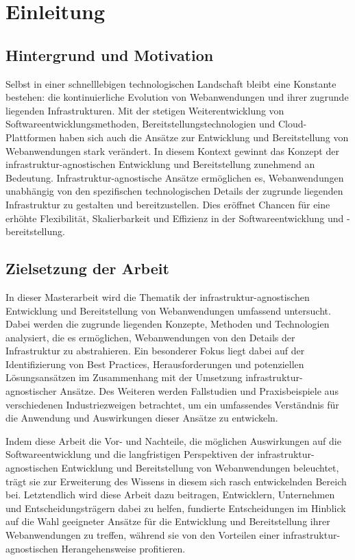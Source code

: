 \chapter{Einleitung}

\section{Hintergrund und Motivation}
Selbst in einer schnelllebigen technologischen Landschaft bleibt eine Konstante bestehen: 
die kontinuierliche Evolution von Webanwendungen und ihrer zugrunde liegenden Infrastrukturen. 
Mit der stetigen Weiterentwicklung von Softwareentwicklungsmethoden, Bereitstellungstechnologien 
und Cloud-Plattformen haben sich auch die Ansätze zur Entwicklung und Bereitstellung von Webanwendungen stark verändert. 
In diesem Kontext gewinnt das Konzept der infrastruktur-agnostischen Entwicklung und Bereitstellung zunehmend an Bedeutung. 
Infrastruktur-agnostische Ansätze ermöglichen es, Webanwendungen unabhängig von den spezifischen technologischen Details der zugrunde liegenden Infrastruktur zu gestalten und bereitzustellen. 
Dies eröffnet Chancen für eine erhöhte Flexibilität, Skalierbarkeit und Effizienz in der Softwareentwicklung und -bereitstellung.


\section{Zielsetzung der Arbeit}
In dieser Masterarbeit wird die Thematik der infrastruktur-agnostischen Entwicklung und Bereitstellung von Webanwendungen umfassend untersucht. 
Dabei werden die zugrunde liegenden Konzepte, Methoden und Technologien analysiert, die es ermöglichen, Webanwendungen von den Details der Infrastruktur zu abstrahieren. 
Ein besonderer Fokus liegt dabei auf der Identifizierung von Best Practices, Herausforderungen und potenziellen Lösungsansätzen im Zusammenhang mit der Umsetzung infrastruktur-agnostischer Ansätze. 
Des Weiteren werden Fallstudien und Praxisbeispiele aus verschiedenen Industriezweigen betrachtet, um ein umfassendes Verständnis für die Anwendung und Auswirkungen dieser Ansätze zu entwickeln.

Indem diese Arbeit die Vor- und Nachteile, die möglichen Auswirkungen auf die Softwareentwicklung und die langfristigen Perspektiven der infrastruktur-agnostischen Entwicklung und Bereitstellung von Webanwendungen beleuchtet, trägt sie zur Erweiterung des Wissens in diesem sich rasch entwickelnden Bereich bei. 
Letztendlich wird diese Arbeit dazu beitragen, Entwicklern, Unternehmen und Entscheidungsträgern dabei zu helfen, fundierte Entscheidungen im Hinblick auf die Wahl geeigneter Ansätze für die Entwicklung und Bereitstellung ihrer Webanwendungen zu treffen, während sie von den Vorteilen einer infrastruktur-agnostischen Herangehensweise profitieren.
